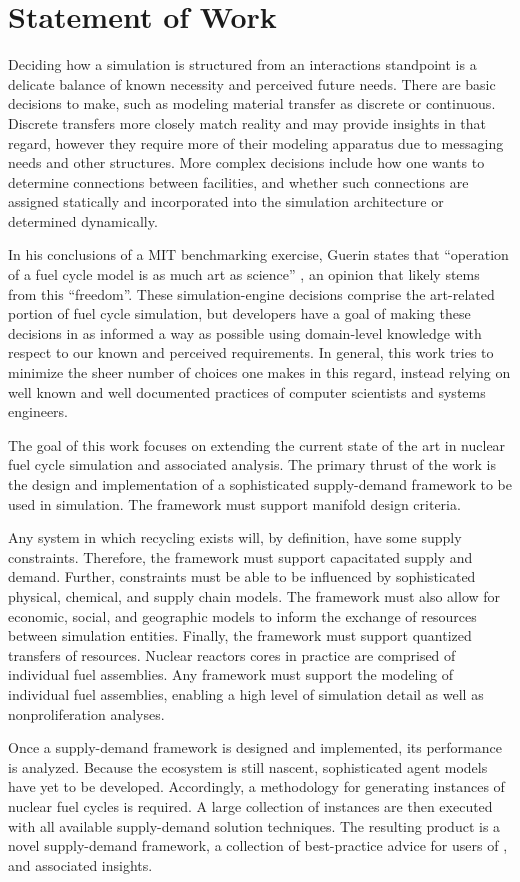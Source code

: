 
\section{Statement of Work}

Deciding how a simulation is structured from an interactions standpoint is a
delicate balance of known necessity and perceived future needs. There are basic
decisions to make, such as modeling material transfer as discrete or
continuous. Discrete transfers more closely match reality and may provide
insights in that regard, however they require more of their modeling apparatus
due to messaging needs and other structures. More complex decisions include how
one wants to determine connections between facilities, and whether such
connections are assigned statically and incorporated into the simulation
architecture or determined dynamically. 

In his conclusions of a MIT benchmarking exercise, Guerin states that
``operation of a fuel cycle model is as much art as science''
\cite{guerin_benchmark_2009}, an opinion that likely stems from this
``freedom''. These simulation-engine decisions comprise the art-related portion
of fuel cycle simulation, but developers have a goal of making these decisions
in as informed a way as possible using domain-level knowledge with respect to
our known and perceived requirements. In general, this work tries to minimize
the sheer number of choices one makes in this regard, instead relying on well
known and well documented practices of computer scientists and systems
engineers.

The goal of this work focuses on extending the current state of the art in
nuclear fuel cycle simulation and associated analysis. The primary thrust of the
work is the design and implementation of a sophisticated supply-demand framework
to be used in simulation. The framework must support manifold design
criteria. 

Any system in which recycling exists will, by definition, have some supply
constraints. Therefore, the framework must support capacitated supply and
demand. Further, constraints must be able to be influenced by sophisticated
physical, chemical, and supply chain models. The framework must also allow for
economic, social, and geographic models to inform the exchange of resources
between simulation entities. Finally, the framework must support quantized
transfers of resources. Nuclear reactors cores in practice are comprised of
individual fuel assemblies. Any framework must support the modeling of
individual fuel assemblies, enabling a high level of simulation detail as well
as nonproliferation analyses.

Once a supply-demand framework is designed and implemented, its performance is
analyzed. Because the \Cyclus ecosystem is still nascent, sophisticated agent
models have yet to be developed. Accordingly, a methodology for generating
instances of nuclear fuel cycles is required. A large collection of instances
are then executed with all available supply-demand solution techniques. The
resulting product is a novel supply-demand framework, a collection of
best-practice advice for users of \Cyclus, and associated insights.
